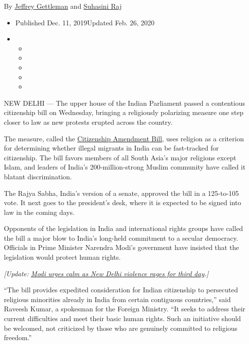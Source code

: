 By \href{https://www.nytimes.com/by/jeffrey-gettleman}{Jeffrey
Gettleman} and \href{https://www.nytimes.com/by/suhasini-raj}{Suhasini
Raj}

\begin{itemize}
\item
  Published Dec. 11, 2019Updated Feb. 26, 2020
\item
  \begin{itemize}
  \item
  \item
  \item
  \item
  \item
  \end{itemize}
\end{itemize}

NEW DELHI --- The upper house of the Indian Parliament passed a
contentious citizenship bill on Wednesday, bringing a religiously
polarizing measure one step closer to law as new protests erupted across
the country.

The measure, called the
\href{https://www.nytimes.com/2019/12/09/world/asia/india-muslims-citizenship-narendra-modi.html}{Citizenship
Amendment Bill}, uses religion as a criterion for determining whether
illegal migrants in India can be fast-tracked for citizenship. The bill
favors members of all South Asia's major religions except Islam, and
leaders of India's 200-million-strong Muslim community have called it
blatant discrimination.

The Rajya Sabha, India's version of a senate, approved the bill in a
125-to-105 vote. It next goes to the president's desk, where it is
expected to be signed into law in the coming days.

Opponents of the legislation in India and international rights groups
have called the bill a major blow to India's long-held commitment to a
secular democracy. Officials in Prime Minister Narendra Modi's
government have insisted that the legislation would protect human
rights.

\emph{{[}Update:}
\href{http://www.nytimes.com/2020/02/26/world/asia/india-hindu-muslim-violence-modi.html}{\emph{Modi
urges calm as New Delhi violence rages for third day}}\emph{.{]}}

``The bill provides expedited consideration for Indian citizenship to
persecuted religious minorities already in India from certain contiguous
countries,'' said Raveesh Kumar, a spokesman for the Foreign Ministry.
``It seeks to address their current difficulties and meet their basic
human rights. Such an initiative should be welcomed, not criticized by
those who are genuinely committed to religious freedom.''

